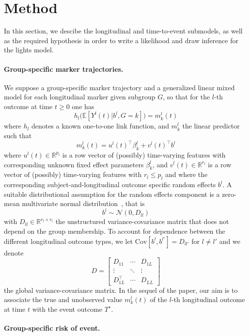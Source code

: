 \documentclass[11pt]{article}
\newcommand{\cN}{\mathcal N}
\newcommand{\R}{\mathds R}
\newcommand{\E}{\mathds E}
\begin{document}
\section{Method}
\label{sec:Method}

In this section, we descibe the longitudinal and time-to-event submodels, as well as the required hypothesis in order to write a likelihood and draw inference for the lights model.

\paragraph{Group-specific marker trajectories.}

We suppose a group-specific marker trajectory and a generalized linear mixed model for each longitudinal marker given subgroup $G$, so that for the $l$-th outcome at time $t \geq 0$ one has
\begin{equation}
	\label{eq:link-function}
 	h_l\big(\E[Y^l(t)|b^l, G=k]\big) = m_k^l(t)
 \end{equation}
where $h_l$ denotes a known one-to-one link function, and $m_k^l$ the linear predictor such that
\[ m_k^l(t) = u^l(t)^\top\beta_k^l + v^l(t)^\top b^l \]
where $u^l(t) \in \R^{p_l}$ is a row vector of (possibly) time-varying features with corresponding unknown fixed effect parameters $\beta_k^l$, and $v^l(t) \in \R^{r_l}$ is a row vector of (possibly) time-varying features with $r_l \leq p_l$ and where the corresponding subject-and-longitudinal outcome specific random effects $b^l$.
A suitable distributional assumption for the random effects component is a zero-mean multivariate normal distribution~\citep{hickey2016joint}, that is
\[ b^l \sim \cN(0, D_{ll}) \]
with $D_{ll} \in \R^{r_l \times r_l}$ the unstructured variance-covariance matrix that does not depend on the group membership. 
To account for dependence between the different longitudinal outcome types, we let $\text{Cov}[b^l,b^{l'}] = D_{ll'}$ for $l \ne l'$ and we denote
\[ D = 
\begin{bmatrix}
  D_{11} & \cdots & D_{1L}\\
  \vdots &  \ddots & \vdots \\
  D_{1L}^\top & \cdots & D_{LL}
\end{bmatrix}
\]
the global variance-covariance matrix.
In the sequel of the paper, our aim is to associate the true and unobserved value $m_k^l(t)$ of the $l$-th longitudinal outcome at time $t$ with the event outcome $T^\star$.

\paragraph{Group-specific risk of event.}
\end{document}
